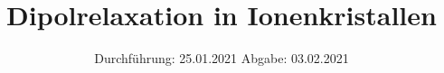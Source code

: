 

\subject{V 48}
\title{Dipolrelaxation in Ionenkristallen}
\date{%
  Durchführung: 25.01.2021
  \hspace{3em}
  Abgabe: 03.02.2021
}



\maketitle
\thispagestyle{empty}
\tableofcontents
\newpage






\printbibliography{}


